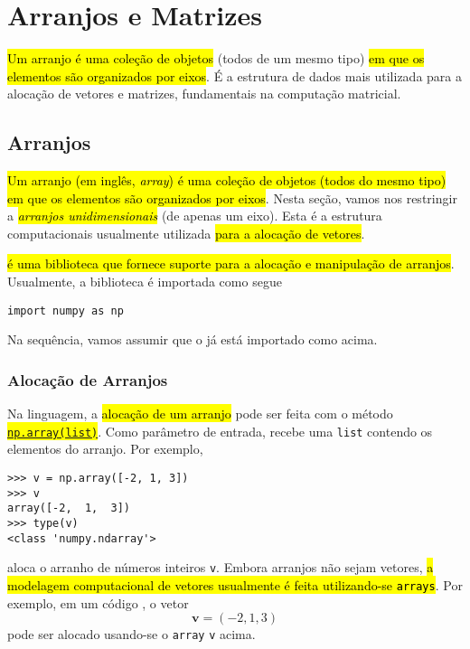 
\chapter{Arranjos e Matrizes}\label{cap_arr}
\thispagestyle{fancy}

\hl{Um arranjo é uma coleção de objetos} (todos de um mesmo tipo) \hl{em que os elementos são organizados por eixos}. É a estrutura de dados mais utilizada para a alocação de vetores e matrizes, fundamentais na computação matricial.

\section{Arranjos}\label{cap_arr_sec_arr}

\hl{Um arranjo (em inglês, \textit{array}) é uma coleção de objetos (todos do mesmo tipo) em que os elementos são organizados por eixos}. Nesta seção, vamos nos restringir a \hl{\emph{arranjos unidimensionais}} (de apenas um eixo). Esta é a estrutura computacionais usualmente utilizada \hl{para a alocação de vetores}.

\hl{{\numpy} é uma biblioteca {\python} que fornece suporte para a alocação e manipulação de arranjos}. Usualmente, a biblioteca é importada como segue
\begin{lstlisting}
import numpy as np
\end{lstlisting}
Na sequência, vamos assumir que o {\numpy} já está importado como acima.

\subsection{Alocação de Arranjos}

Na linguagem, a \hl{alocação de um arranjo} pode ser feita com o método \hl{{\href{https://numpy.org/doc/stable/reference/generated/numpy.array.html}{\lstinline+np.array(list)+}}}. Como parâmetro de entrada, recebe uma \lstinline+list+ contendo os elementos do arranjo. Por exemplo,
\begin{lstlisting}
>>> v = np.array([-2, 1, 3])
>>> v
array([-2,  1,  3])
>>> type(v)
<class 'numpy.ndarray'>
\end{lstlisting}
aloca o arranho de números inteiros \lstinline+v+. Embora arranjos não sejam vetores, \hl{a modelagem computacional de vetores usualmente é feita utilizando-se {\lstinline+arrays+}}. Por exemplo, em um código {\python}, o vetor
\begin{equation}
  \pmb{v} = (-2, 1, 3)
\end{equation}
pode ser alocado usando-se o \lstinline+array+ \lstinline+v+ acima.

